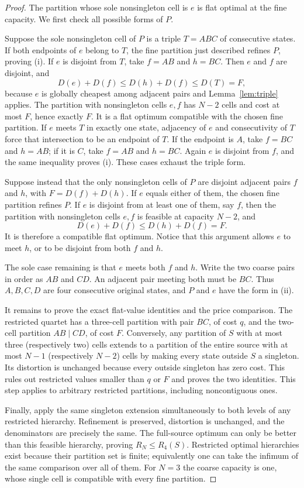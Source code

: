 \documentclass[11pt]{article}
\theoremstyle{remark}\newtheorem{remark}[theorem]{Remark}
\begin{document}
\begin{proof}
The partition whose sole nonsingleton cell is $e$ is flat optimal at the
fine capacity. We first check all possible forms of $P$.

Suppose the sole nonsingleton cell of $P$ is a triple $T=ABC$ of consecutive
states. If both endpoints of $e$ belong to $T$, the fine partition just
described refines $P$, proving (i). If $e$ is disjoint from $T$, take
$f=AB$ and $h=BC$. Then $e$ and $f$ are disjoint, and
\[
 D(e)+D(f)\le D(h)+D(f)\le D(T)=F,
\]
because $e$ is globally cheapest among adjacent pairs and
Lemma~\ref{lem:triple} applies. The partition with nonsingleton cells
$e,f$ has $N-2$ cells and cost at most $F$, hence exactly $F$. It is a
flat optimum compatible with the chosen fine partition. If $e$ meets
$T$ in exactly one state, adjacency of $e$ and consecutivity of $T$
force that intersection to be an endpoint of $T$. If the endpoint is
$A$, take $f=BC$ and $h=AB$; if it is $C$, take $f=AB$ and $h=BC$.
Again $e$ is disjoint from $f$, and the same inequality proves (i).
These cases exhaust the triple form.

Suppose instead that the only nonsingleton cells of $P$ are disjoint
adjacent pairs $f$ and $h$, with $F=D(f)+D(h)$. If $e$ equals either of
them, the chosen fine partition refines $P$. If $e$ is disjoint from at
least one of them, say $f$, then the partition with nonsingleton cells
$e,f$ is feasible at capacity $N-2$, and
\[
 D(e)+D(f)\le D(h)+D(f)=F.
\]
It is therefore a compatible flat optimum. Notice that this argument
allows $e$ to meet $h$, or to be disjoint from both $f$ and $h$.

The sole case remaining is that $e$ meets both $f$ and $h$. Write the two
coarse pairs in order as $AB$ and $CD$. An adjacent pair meeting both
must be $BC$. Thus $A,B,C,D$ are four consecutive original states,
and $P$ and $e$ have the form in (ii).

It remains to prove the exact flat-value identities and the price
comparison. The restricted quartet has a three-cell partition with pair
$BC$, of cost $q$, and the two-cell partition $AB\mid CD$, of cost $F$.
Conversely, any partition of $S$ with at most three (respectively two)
cells extends to a partition of the entire source with at most $N-1$
(respectively $N-2$) cells by making every state outside $S$ a singleton.
Its distortion is unchanged because every outside singleton has zero
cost. This rules out restricted values smaller than $q$ or $F$ and proves
the two identities. This step applies to arbitrary restricted partitions,
including noncontiguous ones.

Finally, apply the same singleton extension simultaneously to both levels
of any restricted hierarchy. Refinement is preserved, distortion is
unchanged, and the denominators are precisely the same. The full-source
optimum can only be better than this feasible hierarchy, proving
$R_N\le R_4(S)$. Restricted optimal hierarchies exist because their
partition set is finite; equivalently one can take the infimum of the
same comparison over all of them. For $N=3$ the coarse capacity is one,
whose single cell is compatible with every fine partition.
\end{proof}
\end{document}
